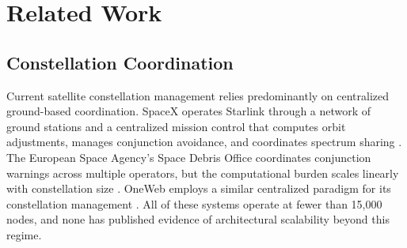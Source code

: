 \documentclass[journal]{IEEEtran}
\begin{document}
\section{Related Work}

\subsection{Constellation Coordination}

Current satellite constellation management relies predominantly on centralized ground-based coordination. SpaceX operates Starlink through a network of ground stations and a centralized mission control that computes orbit adjustments, manages conjunction avoidance, and coordinates spectrum sharing \cite{starlink_ops}. The European Space Agency's Space Debris Office coordinates conjunction warnings across multiple operators, but the computational burden scales linearly with constellation size \cite{esa_conjunction}. OneWeb employs a similar centralized paradigm for its constellation management \cite{oneweb_mgmt}. All of these systems operate at fewer than 15{,}000 nodes, and none has published evidence of architectural scalability beyond this regime.
\end{document}
